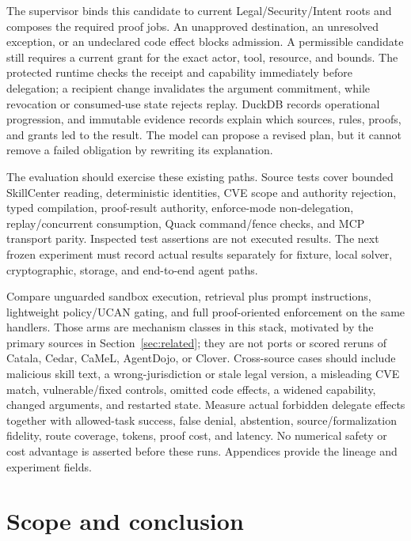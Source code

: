 \documentclass{article}
\begin{document}
The supervisor binds this candidate to current Legal/Security/Intent roots and composes the required proof jobs. An unapproved destination, an unresolved exception, or an undeclared code effect blocks admission. A permissible candidate still requires a current grant for the exact actor, tool, resource, and bounds. The protected runtime checks the receipt and capability immediately before delegation; a recipient change invalidates the argument commitment, while revocation or consumed-use state rejects replay. DuckDB records operational progression, and immutable evidence records explain which sources, rules, proofs, and grants led to the result. The model can propose a revised plan, but it cannot remove a failed obligation by rewriting its explanation.

The evaluation should exercise these existing paths. Source tests cover bounded SkillCenter reading, deterministic identities, CVE scope and authority rejection, typed compilation, proof-result authority, enforce-mode non-delegation, replay/concurrent consumption, Quack command/fence checks, and MCP transport parity. Inspected test assertions are not executed results. The next frozen experiment must record actual results separately for fixture, local solver, cryptographic, storage, and end-to-end agent paths.

Compare unguarded sandbox execution, retrieval plus prompt instructions, lightweight policy/UCAN gating, and full proof-oriented enforcement on the same handlers. Those arms are mechanism classes in this stack, motivated by the primary sources in Section~\ref{sec:related}; they are not ports or scored reruns of Catala, Cedar, CaMeL, AgentDojo, or Clover. Cross-source cases should include malicious skill text, a wrong-jurisdiction or stale legal version, a misleading CVE match, vulnerable/fixed controls, omitted code effects, a widened capability, changed arguments, and restarted state. Measure actual forbidden delegate effects together with allowed-task success, false denial, abstention, source/formalization fidelity, route coverage, tokens, proof cost, and latency. No numerical safety or cost advantage is asserted before these runs. Appendices provide the lineage and experiment fields.

\section{Scope and conclusion}
\end{document}
